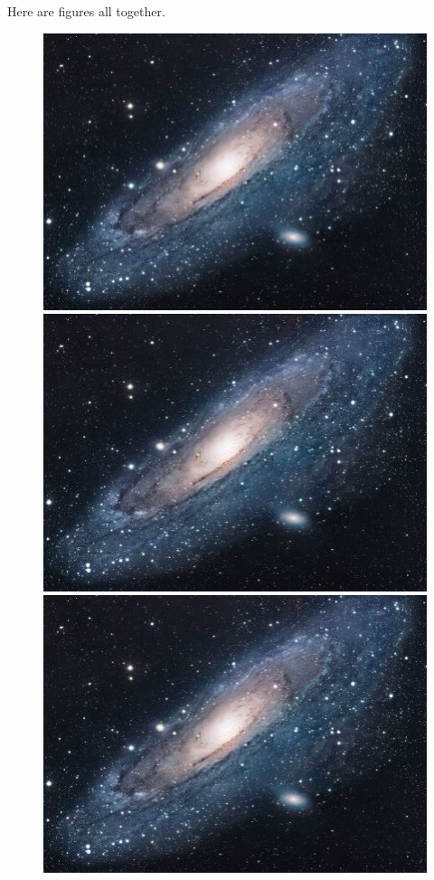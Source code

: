 Here are figures all together. 
\begin{figure}[H]
\centering
\begin{minipage}{.3\textwidth}
  \centering
  \includegraphics[width=.4\linewidth]{figs/universe}
\end{minipage}%
\begin{minipage}{.3\textwidth}
  \centering
  \includegraphics[width=.4\linewidth]{figs/universe}
\end{minipage}
\begin{minipage}{.3\textwidth}
  \centering
  \includegraphics[width=.4\linewidth]{figs/universe}
\end{minipage}


\end{figure}
